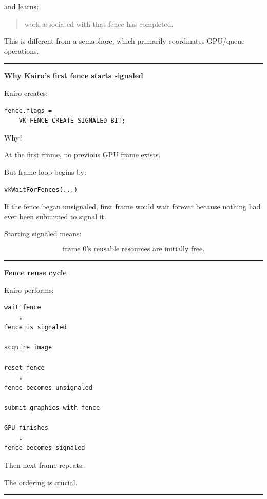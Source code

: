 and learns:

\begin{quote}
work associated with that fence has completed.
\end{quote}

This is different from a semaphore, which primarily coordinates GPU/queue operations.

\begin{center}\rule{0.5\linewidth}{0.5pt}\end{center}

\textbf{Why Kairo's first fence starts signaled}

Kairo creates:

\begin{verbatim}
fence.flags =
    VK_FENCE_CREATE_SIGNALED_BIT;
\end{verbatim}

Why?

At the first frame, no previous GPU frame exists.

But frame loop begins by:

\begin{verbatim}
vkWaitForFences(...)
\end{verbatim}

If the fence began unsignaled, first frame would wait forever because nothing had ever been submitted to signal it.

Starting signaled means:

\[
\boxed{
\text{frame 0's reusable resources are initially free}.
}
\]

\begin{center}\rule{0.5\linewidth}{0.5pt}\end{center}

\textbf{Fence reuse cycle}

Kairo performs:

\begin{verbatim}
wait fence
    ↓
fence is signaled

acquire image

reset fence
    ↓
fence becomes unsignaled

submit graphics with fence

GPU finishes
    ↓
fence becomes signaled
\end{verbatim}

Then next frame repeats.

The ordering is crucial.

\begin{center}\rule{0.5\linewidth}{0.5pt}\end{center}

